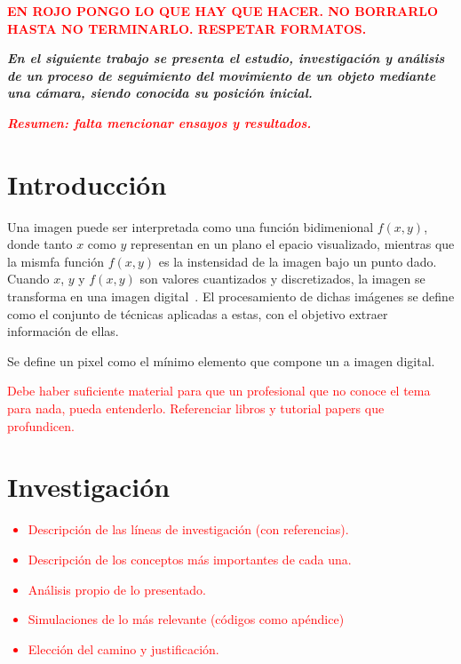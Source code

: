 








\begin{center}
	\Large{\textcolor{red}{\textbf{EN ROJO PONGO LO QUE HAY QUE HACER. NO BORRARLO HASTA NO TERMINARLO. RESPETAR FORMATOS.}}}
\end{center}

\textbf{\textit{En el siguiente trabajo se presenta el estudio, investigación y análisis de un proceso de seguimiento del movimiento de un objeto mediante una cámara, siendo conocida su posición inicial.}}

\textcolor{red}{\textbf{\textit{Resumen: falta mencionar ensayos y resultados.}}}

\section{Introducción}
	Una imagen puede ser interpretada como una función bidimenional $f\left( x, y\right)$, donde tanto $x$ como $y$ representan en un plano el epacio visualizado, mientras que la mismfa función $f\left( x, y\right)$ es la instensidad de la imagen bajo un punto dado. Cuando $x$, $y$ y $f\left( x, y\right)$ son valores cuantizados y discretizados, la imagen se transforma en una imagen digital~\cite{ref:intro1}. 	
	El procesamiento de dichas imágenes se define como el conjunto de técnicas aplicadas a estas, con el objetivo extraer información de ellas. 
	
	Se define un pixel como el mínimo elemento que compone un a imagen digital.

	\textcolor{red}{Debe haber suficiente material para que un profesional que no conoce el tema para nada, pueda entenderlo. Referenciar libros y tutorial papers que profundicen.}
	
\section{Investigación}
\textcolor{red}{
\begin{itemize}
	\item Descripción de las líneas de investigación (con referencias).
	\item Descripción de los conceptos más importantes de cada una.
	\item Análisis propio de lo presentado.
	\item Simulaciones de lo más relevante (códigos como apéndice)
	\item Elección del camino y justificación.
\end{itemize}
}

